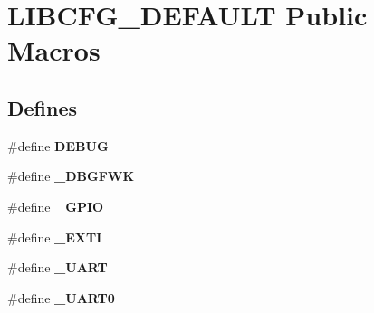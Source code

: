 \hypertarget{group___l_i_b_c_f_g___d_e_f_a_u_l_t___public___macros}{\section{\-L\-I\-B\-C\-F\-G\-\_\-\-D\-E\-F\-A\-U\-L\-T \-Public \-Macros}
\label{group___l_i_b_c_f_g___d_e_f_a_u_l_t___public___macros}
}
\subsection*{\-Defines}
\begin{DoxyCompactItemize}
\item 
\hypertarget{group___l_i_b_c_f_g___d_e_f_a_u_l_t___public___macros_gad72dbcf6d0153db1b8d8a58001feed83}{\#define {\bfseries \-D\-E\-B\-U\-G}}\label{group___l_i_b_c_f_g___d_e_f_a_u_l_t___public___macros_gad72dbcf6d0153db1b8d8a58001feed83}

\item 
\hypertarget{group___l_i_b_c_f_g___d_e_f_a_u_l_t___public___macros_ga110e15eae4e69ef0841ea0a054cd418e}{\#define {\bfseries \-\_\-\-D\-B\-G\-F\-W\-K}}\label{group___l_i_b_c_f_g___d_e_f_a_u_l_t___public___macros_ga110e15eae4e69ef0841ea0a054cd418e}

\item 
\hypertarget{group___l_i_b_c_f_g___d_e_f_a_u_l_t___public___macros_gace4edeb6d039b39d016fe730fc92638a}{\#define {\bfseries \-\_\-\-G\-P\-I\-O}}\label{group___l_i_b_c_f_g___d_e_f_a_u_l_t___public___macros_gace4edeb6d039b39d016fe730fc92638a}

\item 
\hypertarget{group___l_i_b_c_f_g___d_e_f_a_u_l_t___public___macros_ga3f895fc1fd37e0eaed06028750d86dfd}{\#define {\bfseries \-\_\-\-E\-X\-T\-I}}\label{group___l_i_b_c_f_g___d_e_f_a_u_l_t___public___macros_ga3f895fc1fd37e0eaed06028750d86dfd}

\item 
\hypertarget{group___l_i_b_c_f_g___d_e_f_a_u_l_t___public___macros_gaa3b76d63ea514a30ca4911448e9f4241}{\#define {\bfseries \-\_\-\-U\-A\-R\-T}}\label{group___l_i_b_c_f_g___d_e_f_a_u_l_t___public___macros_gaa3b76d63ea514a30ca4911448e9f4241}

\item 
\hypertarget{group___l_i_b_c_f_g___d_e_f_a_u_l_t___public___macros_ga9336c91e175ba088cc544ac1452e2ab3}{\#define {\bfseries \-\_\-\-U\-A\-R\-T0}}\label{group___l_i_b_c_f_g___d_e_f_a_u_l_t___public___macros_ga9336c91e175ba088cc544ac1452e2ab3}


\end{DoxyCompactItemize}
